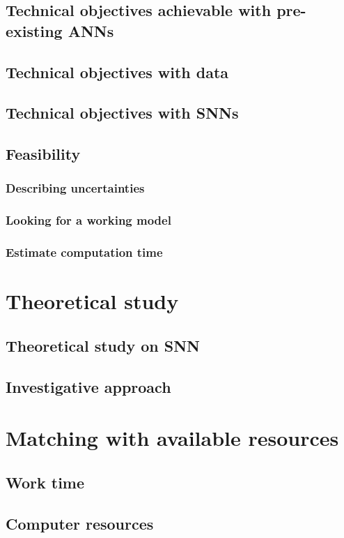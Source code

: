 \documentclass[11pt]{article}
\begin{document}
\subsection{Technical objectives achievable with pre-existing ANNs}
\subsection{Technical objectives with data}
\subsection{Technical objectives with SNNs}
\subsection{Feasibility}
\subsubsection{Describing uncertainties}
\subsubsection{Looking for a working model}
\subsubsection{Estimate computation time}

\section{Theoretical study}
\subsection{Theoretical study on SNN}
\subsection{Investigative approach}

\section{Matching with available resources}
\subsection{Work time}
\subsection{Computer resources}
\end{document}
